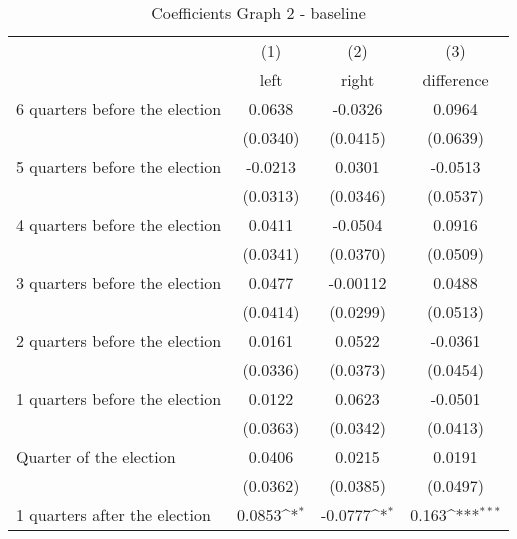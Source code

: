 \begin{table}[!ht]\centering \scriptsize
\def\sym#1{\ifmmode^{#1}\else\(^{#1}\)\fi}
\caption{Coefficients Graph 2 - baseline}
\begin{tabular}{l*{3}{c}}
\hline\hline
                   &\multicolumn{1}{c}{(1)}&\multicolumn{1}{c}{(2)}&\multicolumn{1}{c}{(3)}\\
                    &\multicolumn{1}{c}{left}&\multicolumn{1}{c}{right}&\multicolumn{1}{c}{difference}\\
\hline
 6 quarters before the election&      0.0638         &     -0.0326         &      0.0964         \\
                    &    (0.0340)         &    (0.0415)         &    (0.0639)         \\
[0.5em]
 5 quarters before the election&     -0.0213         &      0.0301         &     -0.0513         \\
                    &    (0.0313)         &    (0.0346)         &    (0.0537)         \\
[0.5em]
 4 quarters before the election&      0.0411         &     -0.0504         &      0.0916         \\
                    &    (0.0341)         &    (0.0370)         &    (0.0509)         \\
[0.5em]
 3 quarters before the election&      0.0477         &    -0.00112         &      0.0488         \\
                    &    (0.0414)         &    (0.0299)         &    (0.0513)         \\
[0.5em]
 2 quarters before the election&      0.0161         &      0.0522         &     -0.0361         \\
                    &    (0.0336)         &    (0.0373)         &    (0.0454)         \\
[0.5em]
 1 quarters before the election&      0.0122         &      0.0623         &     -0.0501         \\
                    &    (0.0363)         &    (0.0342)         &    (0.0413)         \\
[0.5em]
Quarter of the election&      0.0406         &      0.0215         &      0.0191         \\
                    &    (0.0362)         &    (0.0385)         &    (0.0497)         \\
[0.5em]
 1 quarters after the election&      0.0853\sym{*}  &     -0.0777\sym{*}  &       0.163\sym{***}\\

\end{tabular}
\end{table}
